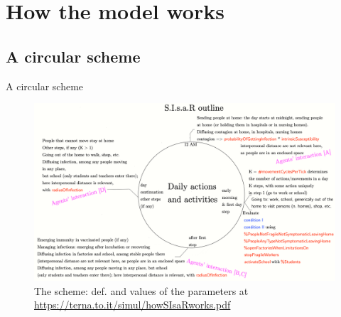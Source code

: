 \documentclass[9pt]{beamer}
\begin{document}




\section{How the model works}

\subsection{A circular scheme}

\begin{frame}{A circular scheme}

\begin{figure}[H]
\center
\includegraphics[scale=0.12]{SIsaR_outline.png}

\caption{The scheme: def. and values of the parameters at \url{https://terna.to.it/simul/howSIsaRworks.pdf}} 
\label{SIsaR_outline}
\end{figure}

\end{frame}

\end{document}
